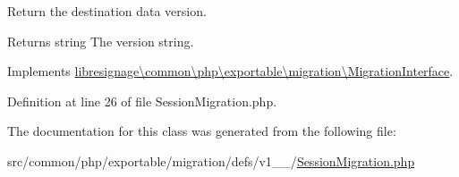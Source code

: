 Return the destination data version.

\begin{DoxyReturn}{Returns}
string The version string. 
\end{DoxyReturn}


Implements \hyperlink{interfacelibresignage_1_1common_1_1php_1_1exportable_1_1migration_1_1MigrationInterface_a9eddabf63771d4d1081bd6d067c7dff5}{libresignage\textbackslash{}common\textbackslash{}php\textbackslash{}exportable\textbackslash{}migration\textbackslash{}\+Migration\+Interface}.



Definition at line 26 of file Session\+Migration.\+php.



The documentation for this class was generated from the following file\+:\begin{DoxyCompactItemize}
\item 
src/common/php/exportable/migration/defs/v1\+\_\+\_/\hyperlink{v1__1__0_2SessionMigration_8php}{Session\+Migration.\+php}\end{DoxyCompactItemize}
